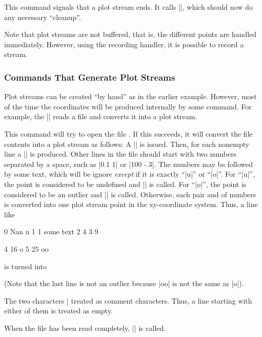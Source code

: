 \begin{command}{\pgfplotstreamend}
    This command signals that a plot stream ends. It calls
    |\pgf@plotstreamend|, which should now do any necessary ``cleanup''.
\end{command}

Note that plot streams are not buffered, that is, the different points are
handled immediately. However, using the recording handler, it is possible to
record a stream.


\subsubsection{Commands That Generate Plot Streams}
\label{section-plot-jumps}

Plot streams can be created ``by hand'' as in the earlier example. However,
most of the time the coordinates will be produced internally by some command.
For example, the |\pgfplotxyfile| reads a file and converts it into a plot
stream.

\begin{command}{\pgfplotxyfile{}}
    This command will try to open the file . If this succeeds,
    it will convert the file contents into a plot stream as follows: A
    |\pgfplotstreamstart| is issued. Then, for each nonempty line a
    |\pgfplotstreamnewdataset| is produced. Other lines in the file should
    start with two numbers separated by a space, such as |0.1 1| or |100 -.3|.
    The numbers may be followed by some text, which will be ignore
    \emph{except} if it is exactly ``|u|'' or ``|o|''. For ``|u|'', the point
    is considered to be undefined and |\pgfplotstreampointundefined| is called.
    For ``|o|'', the point is considered to be an outlier and
    |\pgfplotstreampointoutlier| is called. Otherwise, each pair  and
     of numbers is converted into one  plot stream point in the
    xy-coordinate system. Thus, a line like
\begin{codeexample}[code only, tikz syntax=false]
0 Nan u
1 1 some text
2 4
3 9

4 16 o
5 25 oo
\end{codeexample}
    is turned into
\begin{codeexample}
\pgfplotstreamstart
\pgfplotstreampointundefined
{}
\pgfplotstreamnewdataset
{}
\pgfplotstreamend
\end{codeexample}
    (Note that the last line is not an outlier because |oo| is not the same as
    |o|).

    The two characters |%
    treated as comment characters. Thus, a line starting with either of them is
    treated as empty.

    When the file has been read completely, |\pgfplotstreamend| is called.
\end{command}

